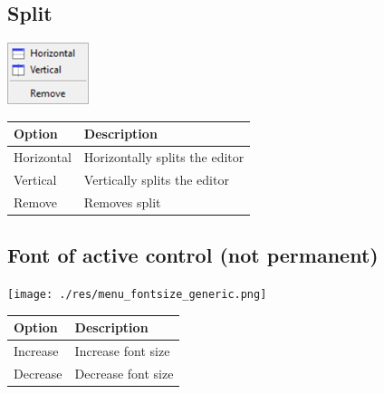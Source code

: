 \hypertarget{menu_view_split}{}
\subsection{Split}

\includegraphics[scale=0.50]{./res/menu_view_split.png}\\

\begin{scriptsize}
  \begin{tabularx}{\textwidth}{>{\hsize=0.3\hsize}X>{\hsize=0.7\hsize}X}\\
    \hline
    \textbf{Option} & \textbf{Description} \\
    \hline
    Horizontal & Horizontally splits the editor \\
    Vertical & Vertically splits the editor \\
    Remove & Removes split \\
    \hline
  \end{tabularx}
\end{scriptsize}


\hypertarget{menu_view_fontsize}{}
\subsection{Font of active control (not permanent)}

\texttt{[image: ./res/menu\_fontsize\_generic.png]}\\

\begin{scriptsize}
  \begin{tabularx}{\textwidth}{>{\hsize=0.3\hsize}X>{\hsize=0.7\hsize}X}\\
    \hline
    \textbf{Option} & \textbf{Description} \\
    \hline
    Increase & Increase font size \\
    Decrease & Decrease font size \\
    \hline
  \end{tabularx}
\end{scriptsize}
